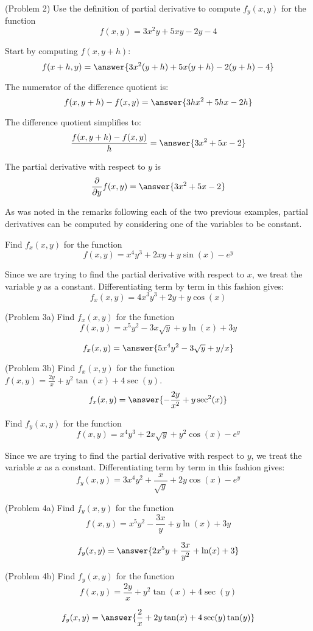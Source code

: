 \documentclass[handout]{ximera}
\begin{document}
\begin{problem}(Problem 2)
Use the definition of partial derivative to compute $f_y(x,y)$ for the function
\[
f(x,y) = 3x^2y + 5xy - 2y - 4
\]

Start by computing $f(x, y+h)$:
\[
f(x+h, y) = \answer{3x^2(y+h) + 5x(y+h) - 2(y+h) - 4}
\]

The numerator of the difference quotient is:
\[
f(x,y+h) - f(x,y) = \answer{3hx^2 + 5hx - 2h}
\]

The difference quotient simplifies to:
\[
\frac{f(x,y+h) - f(x,y)}{h} = \answer{3x^2 + 5x -2}
\]

The partial derivative with respect to $y$ is
\[
\frac{\partial}{\partial y} f(x,y) = \answer{3x^2 + 5x -2}
\]
\end{problem}

As was noted in the remarks following each of the two previous examples, partial derivatives can be computed by considering one of the variables to be constant.

\begin{example}[Example 3]
Find $f_x(x,y)$ for the function 
\[
f(x,y) = x^4y^3 + 2xy + y\sin(x) - e^y
\]

Since we are trying to find the partial derivative with respect to $x$, we treat the variable $y$ as a constant.
Differentiating term by term in this fashion gives:
\[
f_x(x,y) = 4x^3y^3 + 2y + y\cos(x)
\]
\end{example}

\begin{problem}(Problem 3a)
Find $f_x(x,y)$ for the function 
\[
f(x,y) = x^5y^2 - 3x\sqrt y + y\ln(x) + 3y
\]

\[
f_x(x,y) = \answer{5x^4y^2 - 3\sqrt y + y/x}
\]
\end{problem}

\begin{problem}(Problem 3b)
Find $f_x(x,y)$ for the function $f(x,y) = \frac{2y}{x} + y^2\tan(x) + 4\sec(y)$.\\
\[
f_x(x,y) = \answer{-\frac{2y}{x^2} + y\sec^2(x)}
\]
\end{problem}


\begin{example}[Example 4]
Find $f_y(x,y)$ for the function 
\[
f(x,y) = x^4y^3 + 2x\sqrt{y} + y^2\cos(x) - e^y
\]

Since we are trying to find the partial derivative with respect to $y$, we treat the variable $x$ as a constant.
Differentiating term by term in this fashion gives:
\[
f_y(x,y) = 3x^4y^2 + \frac{x}{\sqrt{y}} + 2y\cos(x) - e^y
\]
\end{example}

\begin{problem}(Problem 4a)
Find $f_y(x,y)$ for the function 
\[
f(x,y) = x^5y^2 - \frac{3x}{y} + y\ln(x) + 3y
\]

\[
f_y(x,y) = \answer{2x^5 y + \frac{3x}{y^2} + \ln(x) + 3}
\]
\end{problem}

\begin{problem}(Problem 4b)
Find $f_y(x,y)$ for the function 
\[
f(x,y) = \frac{2y}{x} + y^2\tan(x) + 4\sec(y)
\]

\[
f_y(x,y) = \answer{\frac{2}{x} + 2y\tan(x) + 4\sec(y)\tan(y)}
\]
\end{problem}
\end{document}

